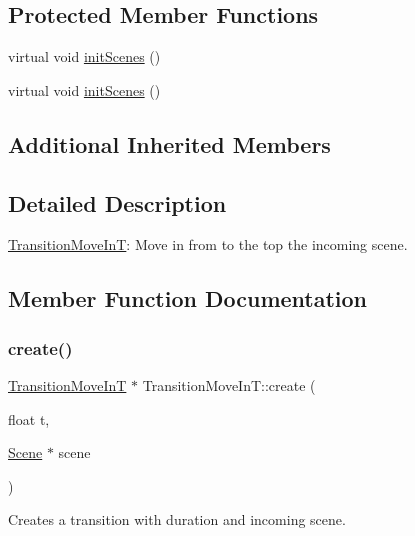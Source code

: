 \subsection*{Protected Member Functions}
\begin{DoxyCompactItemize}
\item 
virtual void \hyperlink{classTransitionMoveInT_a029a7a031fc78f3a1b46f734c7d429b6}{init\+Scenes} ()
\item 
virtual void \hyperlink{classTransitionMoveInT_a25cb721d845913b43a385931ca1851f2}{init\+Scenes} ()
\end{DoxyCompactItemize}
\subsection*{Additional Inherited Members}


\subsection{Detailed Description}
\hyperlink{classTransitionMoveInT}{Transition\+Move\+InT}\+: Move in from to the top the incoming scene. 

\subsection{Member Function Documentation}
\mbox{\label{classTransitionMoveInT_aad3abc7f25bf1fa49f9b358e984b80f0}} 
\subsubsection{\texorpdfstring{create()}{create()}\hspace{0.1cm}{\footnotesize\ttfamily [1/2]}}
{\footnotesize\ttfamily \hyperlink{classTransitionMoveInT}{Transition\+Move\+InT} $\ast$ Transition\+Move\+In\+T\+::create (\begin{DoxyParamCaption}\item[{float}]{t,  }\item[{\hyperlink{classScene}{Scene} $\ast$}]{scene }\end{DoxyParamCaption})\hspace{0.3cm}{\ttfamily [static]}}

Creates a transition with duration and incoming scene.


